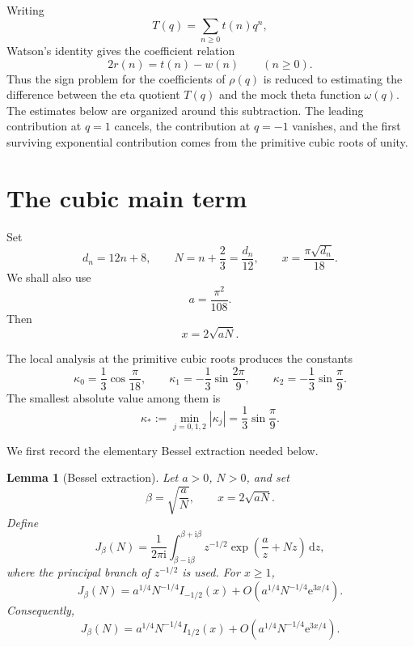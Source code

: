 \documentclass[11pt]{article}
\newtheorem{lemma}[theorem]{Lemma}
\theoremstyle{remark}
\newcommand{\ii}{\mathrm i}
\newcommand{\e}{\mathrm e}
\newcommand{\dd}{\mathrm d}
\begin{document}
Writing
\[
T(q)=\sum_{n\geq0}t(n)q^n,
\]
Watson's identity gives the coefficient relation
\begin{equation}\label{eq:coeff-watson}
2r(n)=t(n)-w(n)\qquad(n\geq0).
\end{equation}
Thus the sign problem for the coefficients of $\rho(q)$ is reduced to estimating the difference between the eta quotient $T(q)$ and the mock theta function $\omega(q)$. The estimates below are organized around this subtraction. The leading contribution at $q=1$ cancels, the contribution at $q=-1$ vanishes, and the first surviving exponential contribution comes from the primitive cubic roots of unity.


\section{The cubic main term}\label{sec:cubic-main}

Set
\begin{equation}\label{eq:dnNx}
d_n=12n+8,
\qquad
N=n+\frac23=\frac{d_n}{12},
\qquad
x=\frac{\pi\sqrt{d_n}}{18}.
\end{equation}
We shall also use
\[
a=\frac{\pi^2}{108}.
\]
Then
\[
x=2\sqrt{aN}.
\]

The local analysis at the primitive cubic roots produces the constants
\begin{equation}\label{eq:kappa}
\kappa_0=\frac13\cos\frac\pi{18},
\qquad
\kappa_1=-\frac13\sin\frac{2\pi}{9},
\qquad
\kappa_2=-\frac13\sin\frac\pi9.
\end{equation}
The smallest absolute value among them is
\begin{equation}\label{eq:kappa-star}
\kappa_*:=\min_{j=0,1,2}|\kappa_j|
=
\frac13\sin\frac\pi9.
\end{equation}

We first record the elementary Bessel extraction needed below.

\begin{lemma}[Bessel extraction]\label{lem:bessel-extraction}
Let $a>0$, $N>0$, and set
\[
\beta=\sqrt{\frac{a}{N}},
\qquad
x=2\sqrt{aN}.
\]
Define
\[
J_\beta(N)
=
\frac1{2\pi\ii}
\int_{\beta-\ii\beta}^{\beta+\ii\beta}
z^{-1/2}
\exp\left(\frac{a}{z}+Nz\right)\,\dd z,
\]
where the principal branch of $z^{-1/2}$ is used. For $x\geq1$,
\begin{equation}\label{eq:J-bessel-minus}
J_\beta(N)
=
a^{1/4}N^{-1/4}I_{-1/2}(x)
+
O\left(a^{1/4}N^{-1/4}\e^{3x/4}\right).
\end{equation}
Consequently,
\begin{equation}\label{eq:J-bessel-plus}
J_\beta(N)
=
a^{1/4}N^{-1/4}I_{1/2}(x)
+
O\left(a^{1/4}N^{-1/4}\e^{3x/4}\right).
\end{equation}
\end{lemma}
\end{document}
